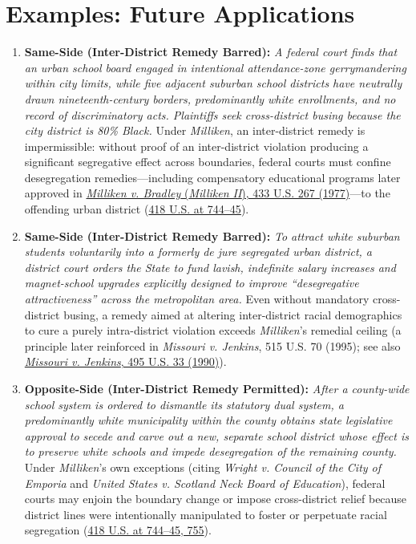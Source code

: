 \documentclass[12pt]{article}
\begin{document}
\section{Examples: Future Applications}
\begin{enumerate}
\item \textbf{Same-Side (Inter-District Remedy Barred):} \textit{A federal court finds that an urban school board engaged in intentional attendance-zone gerrymandering within city limits, while five adjacent suburban school districts have neutrally drawn nineteenth-century borders, predominantly white enrollments, and no record of discriminatory acts. Plaintiffs seek cross-district busing because the city district is 80\% Black.} Under \textit{Milliken}, an inter-district remedy is impermissible: without proof of an inter-district violation producing a significant segregative effect across boundaries, federal courts must confine desegregation remedies---including compensatory educational programs later approved in \href{https://supreme.justia.com/cases/federal/us/433/267/}{\textit{Milliken v. Bradley} (\textit{Milliken II}), 433 U.S. 267 (1977)}---to the offending urban district (\href{https://supreme.justia.com/cases/federal/us/418/717/}{418 U.S. at 744--45}).

\item \textbf{Same-Side (Inter-District Remedy Barred):} \textit{To attract white suburban students voluntarily into a formerly \textit{de jure} segregated urban district, a district court orders the State to fund lavish, indefinite salary increases and magnet-school upgrades explicitly designed to improve ``desegregative attractiveness'' across the metropolitan area.} Even without mandatory cross-district busing, a remedy aimed at altering inter-district racial demographics to cure a purely intra-district violation exceeds \textit{Milliken}'s remedial ceiling (a principle later reinforced in \textit{Missouri v. Jenkins}, 515 U.S. 70 (1995); see also \href{https://supreme.justia.com/cases/federal/us/495/33/}{\textit{Missouri v. Jenkins}, 495 U.S. 33 (1990)}).

\item \textbf{Opposite-Side (Inter-District Remedy Permitted):} \textit{After a county-wide school system is ordered to dismantle its statutory dual system, a predominantly white municipality within the county obtains state legislative approval to secede and carve out a new, separate school district whose effect is to preserve white schools and impede desegregation of the remaining county.} Under \textit{Milliken}'s own exceptions (citing \textit{Wright v. Council of the City of Emporia} and \textit{United States v. Scotland Neck Board of Education}), federal courts may enjoin the boundary change or impose cross-district relief because district lines were intentionally manipulated to foster or perpetuate racial segregation (\href{https://supreme.justia.com/cases/federal/us/418/717/}{418 U.S. at 744--45, 755}).


\end{enumerate}
\end{document}
